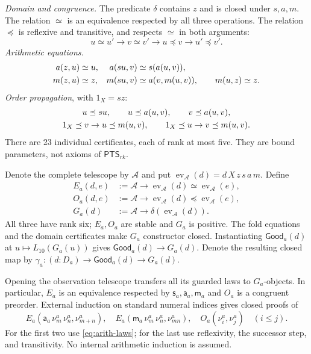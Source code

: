 \documentclass[11pt,a4paper]{article}
\newcommand{\PTS}{\mathsf{PTS}_{rk}}
\newcommand{\ev}{\operatorname{ev}}
\newcommand{\Da}{D_{\!a}}
\newcommand{\sa}{\mathsf s_a}
\newcommand{\adda}{\mathsf a_a}
\newcommand{\ma}{\mathsf m_a}
\newcommand{\Ga}{G_a}
\newcommand{\Ea}{E_a}
\newcommand{\Oa}{O_a}
\newcommand{\Gooda}{\mathsf{Good}_a}
\newcommand{\nua}[1]{\nu^{a}_{#1}}
\theoremstyle{remark}\newtheorem*{remark}{Remark}
\begin{document}
\emph{Domain and congruence.} The predicate $\delta$ contains $z$ and is
closed under $s,a,m$. The relation $\simeq$ is an equivalence respected by
all three operations. The relation $\preceq$ is reflexive and transitive,
and respects $\simeq$ in both arguments:
\[
 u\simeq u'\to v\simeq v'\to u\preceq v\to u'\preceq v'.
\]
\emph{Arithmetic equations.}
\begin{align}
 a(z,u)&\simeq u,& a(su,v)&\simeq s(a(u,v)),\notag\\
 m(z,u)&\simeq z,& m(su,v)&\simeq a(v,m(u,v)),\qquad m(u,z)\simeq z.
 \label{eq:arith-laws}
\end{align}
\emph{Order propagation}, with $1_X=sz$:
\begin{gather}
 u\preceq su,\qquad u\preceq a(u,v),\qquad v\preceq a(u,v),\notag\\
 1_X\preceq v\to u\preceq m(u,v),\qquad
 1_X\preceq u\to v\preceq m(u,v).
 \label{eq:arith-order}
\end{gather}
There are 23 individual certificates, each of rank at most five. They
are bound parameters, not axioms of $\PTS$.

Denote the complete telescope by $\mathcal A$ and put
$\ev_{\mathcal A}(d)=d\,X\,z\,s\,a\,m$. Define
\begin{align*}
 \Ea(d,e)&:=\mathcal A\to
          \ev_{\mathcal A}(d)\simeq\ev_{\mathcal A}(e),\\
 \Oa(d,e)&:=\mathcal A\to
          \ev_{\mathcal A}(d)\preceq\ev_{\mathcal A}(e),\\
 \Ga(d)&:=\mathcal A\to\delta(\ev_{\mathcal A}(d)).
\end{align*}
All three have rank six; $\Ea,\Oa$ are stable and $\Ga$ is positive.
The fold equations and the domain certificates make $\Ga$ constructor
closed. Instantiating $\Gooda(d)$ at $u\mapsto L_{10}(\Ga(u))$ gives
$\Gooda(d)\to\Ga(d)$. Denote the resulting closed map by
$\gamma_a:(d:\Da)\to\Gooda(d)\to\Ga(d)$.

Opening the observation telescope transfers all its guarded laws to
$\Ga$-objects. In particular, $\Ea$ is an equivalence respected by
$\sa,\adda,\ma$ and $\Oa$ is a congruent preorder. External induction on
standard numeral indices gives closed proofs of
\begin{equation}
 \Ea(\adda\,\nua m\,\nua n,\nua{m+n}),\quad
 \Ea(\ma\,\nua m\,\nua n,\nua{mn}),\quad
 \Oa(\nua i,\nua j)\quad(i\le j).
 \label{eq:arith-ground}
\end{equation}
For the first two use \eqref{eq:arith-laws}; for the last use reflexivity,
the successor step, and transitivity. No internal arithmetic induction
is assumed.
\end{document}
